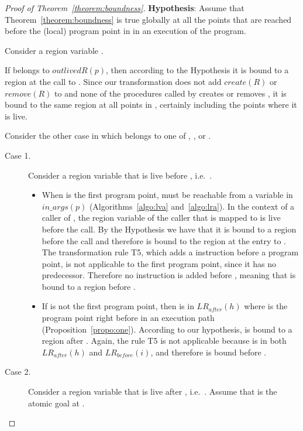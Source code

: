 \documentclass{tlp}
\newcommand{\inargs}[1]{\ensuremath{\mathit{in\_args}(#1)}}
\newcommand{\LRb}[1]{\ensuremath{\mathit{LR}_{before}(#1)}}
\newcommand{\LRa}[1]{\ensuremath{\mathit{LR}_{after}(#1)}}
\newcommand{\outlivedR}[1]{\ensuremath{{outlivedR}(#1)}}
\newcommand{\create}[1]{\ensuremath{{create}(#1)}}
\newcommand{\remove}[1]{\ensuremath{{remove}(#1)}}
\begin{document}
\begin{proof}[Proof of Theorem~\ref{theorem:boundness}]
\textbf{Hypothesis}:
Assume that Theorem~\ref{theorem:boundness} is true globally at all the
points that are reached before the (local) program point  in 
in an execution of the program.

Consider a region variable .

If  belongs to \outlivedR{p},
then according to the Hypothesis
it is bound to a region at the call to .
Since our transformation does not add \create{R} or \remove{R} to 
and none of the procedures called by  creates or removes ,
it is bound to the same region at all points in ,
certainly including the points where it is live.

Consider the other case in which  belongs
to one of , , or .

\begin{description}
\item[Case 1.]
    Consider a region variable  that is live before ,
    i.e.\ .

    \begin{itemize}
    \item
        When  is the first program point,
         must be reachable from a variable in \inargs{p}
        (Algorithms~\ref{algo:lva} and~\ref{algo:lra}).
        In the context of a caller of ,
        the region variable of the caller that  is mapped to
        is live before the call.
        By the Hypothesis we have that
        it is bound to a region before the call
        and therefore  is bound to the region at the entry to .
        The transformation rule T5,
        which adds a  instruction
        before a program point,
        is not applicable to the first program point,
        since it has no predecessor.
        Therefore no  instruction is added before ,
        meaning that  is bound to a region before .

    \item
        If  is not the first program point,
        then  is in \LRa{h}
        where  is the program point right before 
        in an execution path (Proposition~\ref{propo:one}).
        According to our hypothesis,
         is bound to a region after .
        Again, the rule T5 is not applicable
        because  is in both \LRa{h} and \LRb{i},
        and therefore  is bound before .
    \end{itemize}

\item[Case 2.]
    Consider a region variable  that is live after ,
    i.e.\ .
    Assume that  is the atomic goal at .


\end{description}
\end{proof}
\end{document}
